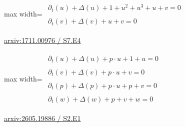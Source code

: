 \documentclass[10pt,a4paper]{article}
\begin{document}
\begin{minipage}{\linewidth}
\begin{center}\begin{adjustbox}{max width=\linewidth}$\displaystyle\begin{gathered}\begin{gathered}\partial_{t}(u)+\Delta(u)+1+u^{2}+u^{3}+u+v=0\end{gathered}\\[5pt]\begin{gathered}\partial_{t}(v)+\Delta(v)+u+v=0\end{gathered}\end{gathered}$\end{adjustbox}\end{center}
{\small \href{https://arxiv.org/html/1711.00976#S7.E4}{arxiv:1711.00976 / S7.E4}}\par
\end{minipage}\par\vspace{7mm}

\begin{minipage}{\linewidth}
\begin{center}\begin{adjustbox}{max width=\linewidth}$\displaystyle\begin{gathered}\begin{gathered}\partial_{t}(u)+\Delta(u)+p\cdot u+1+u=0\end{gathered}\\[5pt]\begin{gathered}\partial_{t}(v)+\Delta(v)+p\cdot u+v=0\end{gathered}\\[5pt]\begin{gathered}\partial_{t}(p)+\Delta(p)+p\cdot u+p+v=0\end{gathered}\\[5pt]\begin{gathered}\partial_{t}(w)+\Delta(w)+p+v+w=0\end{gathered}\end{gathered}$\end{adjustbox}\end{center}
{\small \href{https://arxiv.org/html/2605.19886#S2.E1}{arxiv:2605.19886 / S2.E1}}\par
\end{minipage}\par\vspace{7mm}
\end{document}
